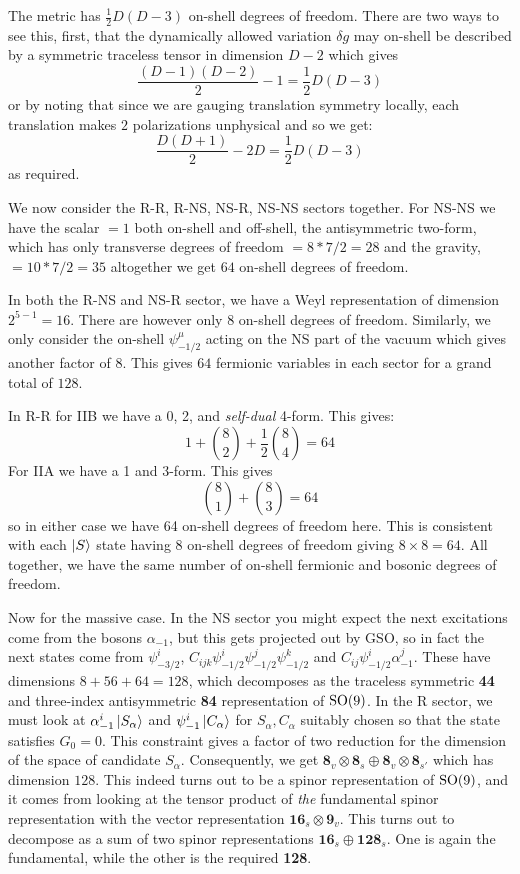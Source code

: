 \documentclass[11pt, class=article, crop=false]{standalone}
\begin{document}
\begin{enumerate}
	The metric has $\frac12 D (D-3)$ on-shell degrees of freedom. There are two ways to see this, first, that the dynamically allowed variation $\delta g$ may on-shell be described by a symmetric traceless tensor in dimension $D-2$ which gives
	\[
		\frac{(D-1)(D-2)}{2} - 1 = \frac12 D (D-3)
	\]
	or by noting that since we are gauging translation symmetry locally, each translation makes $2$ polarizations unphysical and so we get:
	\[
		\frac{D(D+1)}{2} - 2 D = \frac12 D (D-3)
	\]
	as required.
	
	We now consider the R-R, R-NS, NS-R, NS-NS sectors together. For NS-NS we have the scalar $=1$ both on-shell and off-shell, the antisymmetric two-form, which has only transverse degrees of freedom $=8 * 7/2 = 28$ and the gravity, $= 10 * 7/2 = 35$ altogether we get $64$ on-shell degrees of freedom.

	In both the R-NS and NS-R sector, we have a Weyl representation of dimension $2^{5-1} = 16$. There are however only $8$ on-shell degrees of freedom. Similarly, we only consider the on-shell $\psi^\mu_{-1/2}$ acting on the NS part of the vacuum which gives another factor of $8$. This gives $64$ fermionic variables in each sector for a grand total of $128$.

	In R-R for IIB we have a 0, 2, and \emph{self-dual} 4-form. This gives:
	\[
	1 + {8 \choose 2} + \frac12 {8 \choose 4} = 64
	\]
	For IIA we have a 1 and 3-form. This gives
	\[
	{8 \choose 1} + {8 \choose 3} = 64
	\]
	so in either case we have 64 on-shell degrees of freedom here. This is consistent with each $\ket{S}$ state having $8$ on-shell degrees of freedom giving $8 \times 8 = 64$. All together, we have the same number of on-shell fermionic and bosonic degrees of freedom. 

	Now for the massive case. In the NS sector you might expect the next excitations come from the bosons $\alpha_{-1}$, but this gets projected out by GSO, so in fact the next states come from $\psi_{-3/2}^i$, $C_{ijk} \psi_{-1/2}^i \psi_{-1/2}^j \psi_{-1/2}^k$ and $C_{ij} \psi_{-1/2}^i \alpha_{-1}^j$. These have dimensions $8+56+64 = 128$, which decomposes as the traceless symmetric \textbf{44} and three-index antisymmetric \textbf{84} representation of $\mathrm{SO}(9)$. In the R sector, we must look at $\alpha_{-1}^i \ket{S_\alpha}$ and $\psi_{-1}^i \ket{C_\alpha}$ for $S_\alpha, C_\alpha$ suitably chosen so that the state satisfies $G_0 = 0$. This constraint gives a factor of two reduction for the dimension of the space of candidate $S_\alpha$. Consequently, we get $\mathbf{8}_v \otimes \mathbf{8}_s \oplus \mathbf{8}_v \otimes \mathbf{8}_{s'}$ which has dimension $128$. This indeed turns out to be a spinor representation of $\mathrm{SO}(9)$, and it comes from looking at the tensor product of \emph{the} fundamental spinor representation with the vector representation $\mathbf{16}_s \otimes \mathbf{9}_v$. This turns out to decompose as a sum of two spinor representations $\mathbf{16}_s \oplus \mathbf{128}_s$. One is again the fundamental, while the other is the required \textbf{128}. 
	

\end{enumerate}
\end{document}
